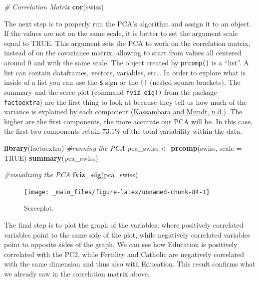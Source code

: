 \documentclass[
]{article}
\newenvironment{Shaded}{\begin{snugshade}}{\end{snugshade}}
\newcommand{\AttributeTok}[1]{\textcolor[rgb]{0.13,0.29,0.53}{#1}}
\newcommand{\CommentTok}[1]{\textcolor[rgb]{0.56,0.35,0.01}{\textit{#1}}}
\newcommand{\ConstantTok}[1]{\textcolor[rgb]{0.56,0.35,0.01}{#1}}
\newcommand{\FunctionTok}[1]{\textcolor[rgb]{0.13,0.29,0.53}{\textbf{#1}}}
\newcommand{\NormalTok}[1]{#1}
\newcommand{\OtherTok}[1]{\textcolor[rgb]{0.56,0.35,0.01}{#1}}
\begin{document}
\begin{Shaded}
\begin{Highlighting}[]
\CommentTok{\# Correlation Matrix}
\FunctionTok{cor}\NormalTok{(swiss)}
\end{Highlighting}
\end{Shaded}

The next step is to properly run the PCA's algorithm and assign it to an
object. If the values are not on the same scale, it is better to set the
argument scale equal to TRUE. This argument sets the PCA to work on the
correlation matrix, instead of on the covariance matrix, allowing to
start from values all centered around 0 and with the same scale. The
object created by \texttt{prcomp()} is a ``list''. A list can contain dataframes,
vectors, variables, etc\ldots{} In order to explore what is inside of a list
you can use the \texttt{\$} sign or the \texttt{{[}{]}} (nested square brackets). The
summary and the scree plot (command \texttt{fviz\_eig()} from the package
\texttt{factoextra}) are the first thing to look at because they tell us how
much of the variance is explained by each component (\protect\hyperlink{ref-kassambara}{Kassambara and Mundt, n.d.}). The
higher are the first components, the more accurate our PCA will be. In
this case, the first two components retain 73.1\% of the total
variability within the data.

\begin{Shaded}
\begin{Highlighting}[]
\FunctionTok{library}\NormalTok{(factoextra)}
\CommentTok{\#running the PCA}
\NormalTok{pca\_swiss }\OtherTok{\textless{}{-}} \FunctionTok{prcomp}\NormalTok{(swiss, }\AttributeTok{scale =} \ConstantTok{TRUE}\NormalTok{)}
\FunctionTok{summary}\NormalTok{(pca\_swiss)}

\CommentTok{\#visualizing the PCA}
\FunctionTok{fviz\_eig}\NormalTok{(pca\_swiss)}
\end{Highlighting}
\end{Shaded}

\begin{figure}[H]

{\centering \texttt{[image: \_main\_files/figure-latex/unnamed-chunk-84-1]} 

}

\caption{Screeplot.}\label{fig:unnamed-chunk-84}
\end{figure}

The final step is to plot the graph of the variables, where positively
correlated variables point to the same side of the plot, while
negatively correlated variables point to opposite sides of the graph. We
can see how Education is positively correlated with the PC2, while
Fertility and Catholic are negatively correlated with the same dimension
and thus also with Education. This result confirms what we already saw
in the correlation matrix above.
\end{document}
